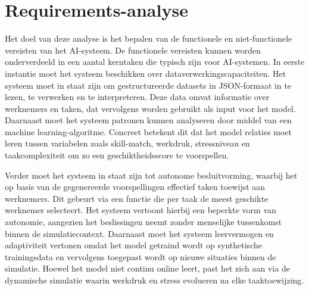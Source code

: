 \section{Requirements-analyse}
\label{ch:requirements}





\vspace{1em}Het doel van deze analyse is het bepalen van de functionele en niet-functionele vereisten van het AI-systeem. De functionele vereisten kunnen worden onderverdeeld in een aantal kerntaken die typisch zijn voor AI-systemen. In eerste instantie moet het systeem beschikken over dataverwerkingscapaciteiten. Het systeem moet in staat zijn om gestructureerde datasets in JSON-formaat in te lezen, te verwerken en te interpreteren. Deze data omvat informatie over werknemers en taken, dat vervolgens worden gebruikt als input voor het model. Daarnaast moet het systeem patronen kunnen analyseren door middel van een machine learning-algoritme. Concreet betekent dit dat het model relaties moet leren tussen variabelen zoals skill-match, werkdruk, stressniveau en taakcomplexiteit om zo een geschiktheidsscore te voorspellen.

Verder moet het systeem in staat zijn tot autonome besluitvorming, waarbij het op basis van de gegenereerde voorspellingen effectief taken toewijst aan werknemers. Dit gebeurt via een functie die per taak de meest geschikte werknemer selecteert. Het systeem vertoont hierbij een beperkte vorm van autonomie, aangezien het beslissingen neemt zonder menselijke tussenkomst binnen de simulatiecontext. Daarnaast moet het systeem leervermogen en adaptiviteit vertonen omdat het model getraind wordt op synthetische trainingsdata en vervolgens toegepast wordt op nieuwe situaties binnen de simulatie. Hoewel het model niet continu online leert, past het zich aan via de dynamische simulatie waarin werkdruk en stress evolueren na elke taaktoewijzing.

